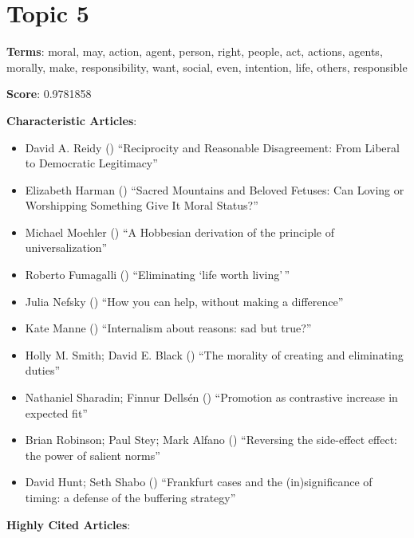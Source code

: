 \documentclass[
  10pt,
  letterpaper,
  DIV=11,
  numbers=noendperiod,
  twoside]{scrartcl}
\providecommand{\tightlist}{%
  \setlength{\itemsep}{0pt}\setlength{\parskip}{0pt}}\usepackage{longtable,booktabs,array}
\begin{document}
\section{Topic 5}\label{topic-5}

\textbf{Terms}: moral, may, action, agent, person, right, people, act,
actions, agents, morally, make, responsibility, want, social, even,
intention, life, others, responsible

\textbf{Score}: 0.9781858

\textbf{Characteristic Articles}:

\begin{itemize}
\tightlist
\item
  David A. Reidy () ``Reciprocity
  and Reasonable Disagreement: From Liberal to Democratic Legitimacy''
\item
  Elizabeth Harman () ``Sacred
  Mountains and Beloved Fetuses: Can Loving or Worshipping Something
  Give It Moral Status?''
\item
  Michael Moehler () ``A
  Hobbesian derivation of the principle of universalization''
\item
  Roberto Fumagalli ()
  ``Eliminating `life worth living'\,''
\item
  Julia Nefsky () ``How you can
  help, without making a difference''
\item
  Kate Manne () ``Internalism
  about reasons: sad but true?''
\item
  Holly M. Smith; David E. Black
  ()
  ``The morality of creating and eliminating duties''
\item
  Nathaniel Sharadin; Finnur Dellsén
  () ``Promotion as contrastive
  increase in expected fit''
\item
  Brian Robinson; Paul Stey; Mark Alfano
  () ``Reversing the side-effect
  effect: the power of salient norms''
\item
  David Hunt; Seth Shabo ()
  ``Frankfurt cases and the (in)significance of timing: a defense of the
  buffering strategy''
\end{itemize}

\textbf{Highly Cited Articles}:
\end{document}
